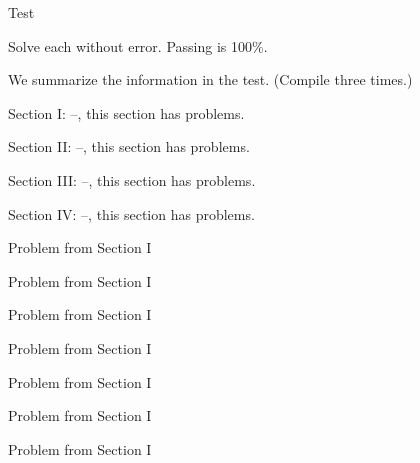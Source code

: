 \documentclass{article}
\title[\sExam]{\Exam}
\author{Dr.\ D. P. Story}
\date{Spring, 2012}
\begin{document}
\maketitle

\begin{exam}{Test\nExam}

\begin{instructions}\relax\parindent0pt\parskip6pt
Solve each without error. Passing is 100\%.

We summarize the information in the test. (Compile three times.)

Section I: --, this section
has  problems.

Section II: --, this section
has  problems.

Section III: --, this section
has  problems.

Section IV: --, this section
has  problems.
\end{instructions}


\begin{problem}[5]
Problem from Section I
\end{problem}

\begin{problem}[5]
Problem from Section I
\end{problem}

\begin{problem}[5]
Problem from Section I
\end{problem}

\begin{problem}[5]
Problem from Section I
\end{problem}

\begin{problem}[5]
Problem from Section I
\end{problem}

\begin{problem}[5]
Problem from Section I
\end{problem}

\begin{problem}[5]
Problem from Section I
\end{problem}



\end{exam}
\end{document}
